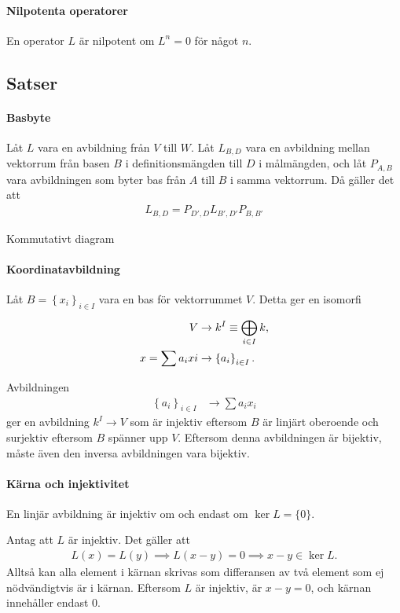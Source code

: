 \paragraph{Nilpotenta operatorer}
En operator $L$ är nilpotent om $L^{n} = 0$ för något $n$.

\subsection{Satser}

\paragraph{Basbyte}
Låt $L$ vara en avbildning från $V$ till $W$. Låt $L_{B, D}$ vara en avbildning mellan vektorrum från basen $B$ i definitionsmängden till $D$ i målmängden, och låt $P_{A, B}$ vara avbildningen som byter bas från $A$ till $B$ i samma vektorrum. Då gäller det att
\begin{align*}
	L_{B, D} = P_{D', D}L_{B', D'}P_{B, B'}
\end{align*}

\proof
Kommutativt diagram

\paragraph{Koordinatavbildning}
Låt $B = \left\{x_{i}\right\}_{i\in I}$ vara en bas för vektorrummet $V$. Detta ger en isomorfi
\begin{align*}
	V                  &\to k^{I}\equiv \bigoplus\limits_{i\in I}^{}k, \\
	x = \sum a_{i}x{i} &\to \left\{a_{i}\right\}_{i\in I}.
\end{align*}

\proof
Avbildningen
\begin{align*}
	\left\{a_{i}\right\}_{i\in I} &\to \sum a_{i}x_{i}
\end{align*}
ger en avbildning $k^{I}\to V$ som är injektiv eftersom $B$ är linjärt oberoende och surjektiv eftersom $B$ spänner upp $V$. Eftersom denna avbildningen är bijektiv, måste även den inversa avbildningen vara bijektiv.

\paragraph{Kärna och injektivitet}
En linjär avbildning är injektiv om och endast om $\ker{L} = \{0\}$.

\proof
Antag att $L$ är injektiv. Det gäller att
\begin{align*}
	L(x) = L(y)\implies L(x - y) = 0\implies x - y\in\ker{L}.
\end{align*}
Alltså kan alla element i kärnan skrivas som differansen av två element som ej nödvändigtvis är i kärnan. Eftersom $L$ är injektiv, är $x - y = 0$, och kärnan innehåller endast $0$.

